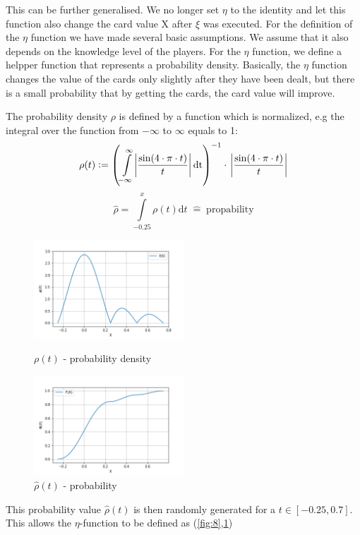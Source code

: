 This can be further generalised. We no longer set $\eta$ to the identity and let this function also change the card value X after $\xi$ was executed. For the definition of the $\eta$ function we have made several basic assumptions. We assume that it also depends on the knowledge level of the players. For the $\eta$ function, we define a helpper function that represents a probability density. Basically, the $\eta$ function changes the value of the cards only slightly after they have been dealt, but there is a small probability that by getting the cards, the card value will improve.
\begin{definition}
The probability density $\rho$ is defined by a function which is normalized, e.g the integral over the function from $-\infty$ to $\infty$ equals to 1:
$$
\rho (t) := \left(\int\limits_{-\infty}^{\infty}\abs{\frac{\sin(4\cdot\pi\cdot t)}{t}}\mathrm{dt}\right)^{-1}\cdot\;\abs{\frac{\sin(4\cdot\pi\cdot t)}{t}}
$$
$$
\widehat{\rho} = \int\limits_{-0.25}^{x}\rho (t)\mathrm{d} t\;\widehat{=}\;\mathrm{propability}
$$
\end{definition}
\begin{figure}[h]
    \centering
    \includegraphics[width=0.5\textwidth]{Bilder/b1_e}
    \caption{$\rho(t)$ - probability density}
    \label{fig:8}
    \centering
    \includegraphics[width=0.5\textwidth]{Bilder/b1_f}
    \caption{$\widehat{\rho}(t)$ - probability}
    \label{fig:9}
\end{figure}
This probability value $\hat{\rho}(t)$ is then randomly generated for a $t\in [-0.25,0.7]$. This allows the $\eta$-function to be defined as (\ref{fig:8},\ref{fig:9})
